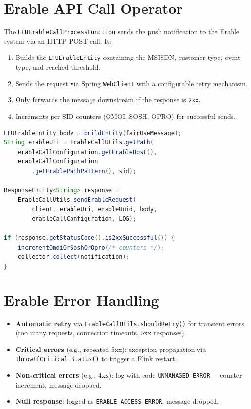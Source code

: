 \section{Erable API Call Operator}

The \texttt{LFUErableCallProcessFunction} sends the push notification to the Erable system via an HTTP POST call. It:
\begin{enumerate}
    \item Builds the \texttt{LFUErableEntity} containing the MSISDN, customer type, event type, and reached threshold.
    \item Sends the request via Spring \texttt{WebClient} with a configurable retry mechanism.
    \item Only forwards the message downstream if the response is \texttt{2xx}.
    \item Increments per-SID counters (OMOI, SOSH, OPRO) for successful sends.
\end{enumerate}

\begin{lstlisting}[language=Java, caption={HTTP call to Erable}, breaklines=true]
LFUErableEntity body = buildEntity(fairUseMessage);
String erableUri = ErableCallUtils.getPath(
    erableCallConfiguration.getErableHost(),
    erableCallConfiguration
        .getErablePathPattern(), sid);

ResponseEntity<String> response =
    ErableCallUtils.sendErableRequest(
        client, erableUri, erableUuid, body,
        erableCallConfiguration, LOG);

if (response.getStatusCode().is2xxSuccessful()) {
    incrementOmoiOrSoshOrOpro(/* counters */);
    collector.collect(notification);
}
\end{lstlisting}

\section{Erable Error Handling}

\begin{itemize}
    \item \textbf{Automatic retry} via \texttt{ErableCallUtils.shouldRetry()} for transient errors (too many requests, connection timeouts, 5xx responses).
    \item \textbf{Critical errors} (e.g., repeated 5xx): exception propagation via \texttt{throwIfCritical Status()} to trigger a Flink restart.
    \item \textbf{Non-critical errors} (e.g., 4xx): log with code \texttt{UNMANAGED\_ERROR} + counter increment, message dropped.
    \item \textbf{Null response}: logged as \texttt{ERABLE\_ACCESS\_ERROR}, message dropped.
\end{itemize}

